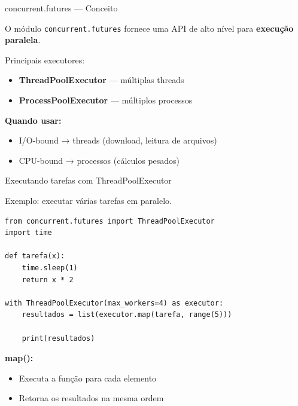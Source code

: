 \documentclass{beamer}
\begin{document}
\begin{frame}[fragile]{concurrent.futures — Conceito}
    
    O módulo \texttt{concurrent.futures} fornece uma API de alto nível para \textbf{execução paralela}.
    
    \vspace{0.4cm}
    
    Principais executores:
    
    \begin{itemize}
        \item \textbf{ThreadPoolExecutor} — múltiplas threads
        \item \textbf{ProcessPoolExecutor} — múltiplos processos
    \end{itemize}
    
    \vspace{0.4cm}
    
    \textbf{Quando usar:}
    
    \begin{itemize}
        \item I/O-bound → threads (download, leitura de arquivos)
        \item CPU-bound → processos (cálculos pesados)
    \end{itemize}
    
\end{frame}

\begin{frame}[fragile]{Executando tarefas com ThreadPoolExecutor}
    
    Exemplo: executar várias tarefas em paralelo.
    
    \begin{verbatim}
from concurrent.futures import ThreadPoolExecutor
import time

def tarefa(x):
    time.sleep(1)
    return x * 2

with ThreadPoolExecutor(max_workers=4) as executor:
    resultados = list(executor.map(tarefa, range(5)))

    print(resultados)
    \end{verbatim}
    
    \textbf{map():}
    \begin{itemize}
        \item Executa a função para cada elemento
        \item Retorna os resultados na mesma ordem
    \end{itemize}
    
\end{frame}
\end{document}
